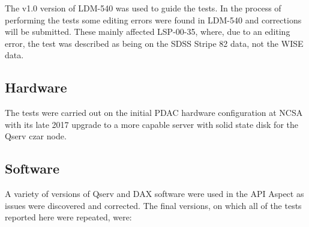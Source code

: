 \documentclass[DM,lsstdraft,STR,toc]{lsstdoc}
\begin{document}
The v1.0 version of LDM-540 was used to guide the tests.
In the process of performing the tests some editing errors were found in LDM-540 and corrections will be submitted.
These mainly affected LSP-00-35, where, due to an editing error,
the test was described as being on the SDSS Stripe 82 data, not the WISE data.

\subsection{Hardware}

The tests were carried out on the initial PDAC hardware configuration at NCSA with its late 2017 upgrade to a more capable server with solid state disk for the Qserv czar node.

\subsection{Software}

A variety of versions of Qserv and DAX software were used in the API Aspect as issues were discovered and corrected.
The final versions, on which all of the tests reported here were repeated, were:
\end{document}
